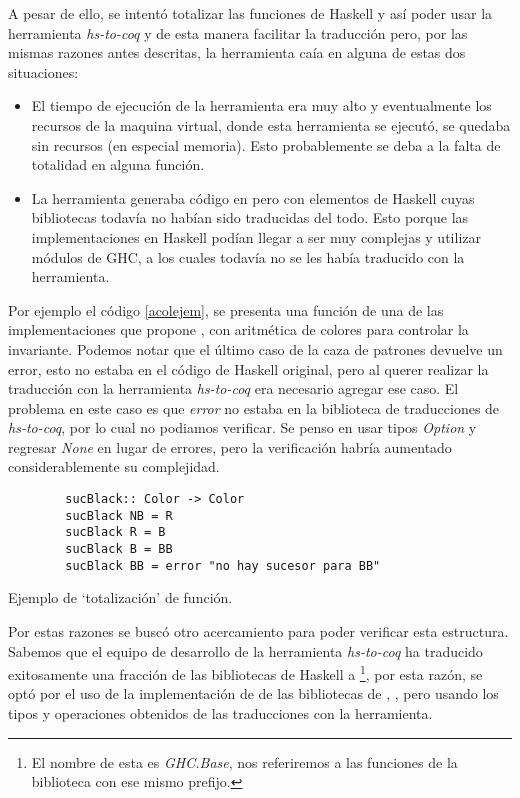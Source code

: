 A pesar de ello, se intent\'o totalizar las funciones de Haskell y así poder usar la herramienta 
\textit{hs-to-coq} y de esta manera facilitar la traducci\'on pero, por las mismas razones antes 
descritas, la herramienta caía en alguna de estas dos situaciones:

\begin{itemize}
    \item El tiempo de ejecuci\'on de la herramienta era muy alto y eventualmente los recursos de
    la maquina virtual, donde esta herramienta se ejecut\'o, se quedaba sin recursos (en
    especial memoria). Esto probablemente se deba a la falta de totalidad en alguna función.
    \item La herramienta generaba c\'odigo en {\coq} pero con elementos de Haskell cuyas bibliotecas
    todavía no habían sido traducidas del todo. Esto porque las implementaciones en Haskell pod\'ian
    llegar a ser muy complejas y utilizar módulos de GHC, a los cuales todav\'ia no se les hab\'ia
    traducido con la herramienta.
\end{itemize}{}

Por ejemplo el c\'odigo \ref{acolejem}, se presenta una funci\'on de una de las implementaciones que propone 
\cite{tesisG}, {\arns} con aritm\'etica de colores para controlar la invariante. Podemos notar que el \'ultimo
caso de la caza de patrones devuelve un error, esto no estaba en el c\'odigo de Haskell original, pero al querer 
realizar la traducci\'on con la herramienta \textit{hs-to-coq} era necesario agregar ese caso. El problema en 
este caso es que \textit{error} no estaba en la biblioteca de traducciones de \textit{hs-to-coq}, por lo cual no 
podiamos verificar. Se penso en usar tipos \textit{Option} y regresar \textit{None} en lugar de errores, pero la 
verificaci\'on habr\'ia aumentado considerablemente su complejidad.

\begin{listing}[!ht]
    \centering
    \captionsetup{justification=centering}
    \begin{verbatim}
        sucBlack:: Color -> Color
        sucBlack NB = R
        sucBlack R = B
        sucBlack B = BB
        sucBlack BB = error "no hay sucesor para BB"
    \end{verbatim}
    \caption{Ejemplo de `totalizaci\'on' de funci\'on.}
    \label{acolejem}
    \end{listing}

Por estas razones se busc\'o otro acercamiento para poder verificar esta estructura.
Sabemos que el equipo de desarrollo de la herramienta \textit{hs-to-coq} ha traducido exitosamente 
una fracci\'on de las bibliotecas de Haskell a {\coq}\footnote{El nombre de esta es 
\textit{GHC.Base}, nos referiremos a las funciones de la biblioteca con ese mismo prefijo.}, por 
esta raz\'on, se opt\'o por el uso de la implementación de {\arns} de las bibliotecas de {\coq}, 
\cite{MSetRBT}, pero usando los tipos y operaciones obtenidos de las traducciones con la herramienta.

